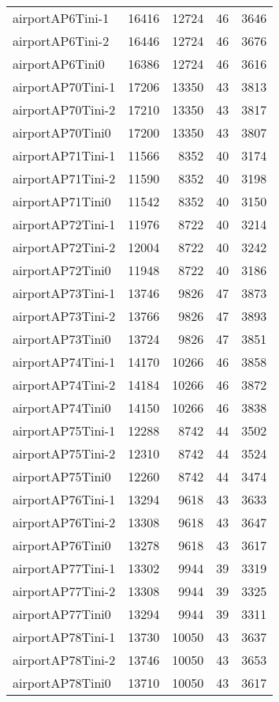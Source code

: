 \begin{longtable}{lrrrr}
airportAP6Tini-1 & 16416 & 12724 & 46 & 3646 \\
airportAP6Tini-2 & 16446 & 12724 & 46 & 3676 \\
airportAP6Tini0 & 16386 & 12724 & 46 & 3616 \\
airportAP70Tini-1 & 17206 & 13350 & 43 & 3813 \\
airportAP70Tini-2 & 17210 & 13350 & 43 & 3817 \\
airportAP70Tini0 & 17200 & 13350 & 43 & 3807 \\
airportAP71Tini-1 & 11566 & 8352 & 40 & 3174 \\
airportAP71Tini-2 & 11590 & 8352 & 40 & 3198 \\
airportAP71Tini0 & 11542 & 8352 & 40 & 3150 \\
airportAP72Tini-1 & 11976 & 8722 & 40 & 3214 \\
airportAP72Tini-2 & 12004 & 8722 & 40 & 3242 \\
airportAP72Tini0 & 11948 & 8722 & 40 & 3186 \\
airportAP73Tini-1 & 13746 & 9826 & 47 & 3873 \\
airportAP73Tini-2 & 13766 & 9826 & 47 & 3893 \\
airportAP73Tini0 & 13724 & 9826 & 47 & 3851 \\
airportAP74Tini-1 & 14170 & 10266 & 46 & 3858 \\
airportAP74Tini-2 & 14184 & 10266 & 46 & 3872 \\
airportAP74Tini0 & 14150 & 10266 & 46 & 3838 \\
airportAP75Tini-1 & 12288 & 8742 & 44 & 3502 \\
airportAP75Tini-2 & 12310 & 8742 & 44 & 3524 \\
airportAP75Tini0 & 12260 & 8742 & 44 & 3474 \\
airportAP76Tini-1 & 13294 & 9618 & 43 & 3633 \\
airportAP76Tini-2 & 13308 & 9618 & 43 & 3647 \\
airportAP76Tini0 & 13278 & 9618 & 43 & 3617 \\
airportAP77Tini-1 & 13302 & 9944 & 39 & 3319 \\
airportAP77Tini-2 & 13308 & 9944 & 39 & 3325 \\
airportAP77Tini0 & 13294 & 9944 & 39 & 3311 \\
airportAP78Tini-1 & 13730 & 10050 & 43 & 3637 \\
airportAP78Tini-2 & 13746 & 10050 & 43 & 3653 \\
airportAP78Tini0 & 13710 & 10050 & 43 & 3617 \\

\end{longtable}
